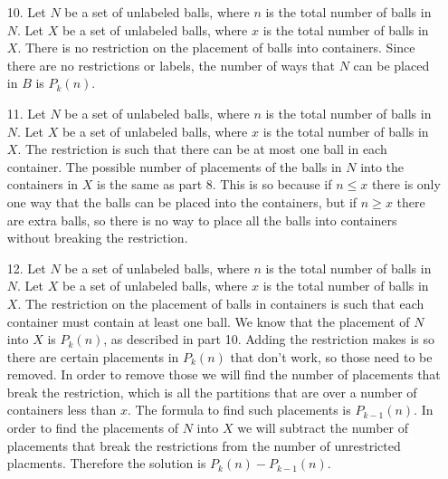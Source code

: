 \documentclass[10pt,a4paper]{report}
\begin{document}
\begin{enumerate}
		\item[10.] Let $N$ be a set of unlabeled balls, where $n$ is the total number of balls in $N$.  Let $X$ be a set of unlabeled balls, where $x$ is the total number of balls in $X$.  There is no restriction on the placement of balls into containers.  Since there are no restrictions or labels, the number of ways that $N$ can be placed in $B$ is $P_{k}(n)$.  
		
		\item[11.] Let $N$ be a set of unlabeled balls, where $n$ is the total number of balls in $N$.  Let $X$ be a set of unlabeled balls, where $x$ is the total number of balls in $X$. The restriction is such that there can be at most one ball in each container.  The possible number of placements of the balls in $N$ into the containers in $X$ is the same as part 8.  This is so because if $n\leq x$ there is only one way that the balls can be placed into the containers, but if $n\geq x$ there are extra balls, so there is no way to place all the balls into containers without breaking the restriction.
		
		\item[12.] Let $N$ be a set of unlabeled balls, where $n$ is the total number of balls in $N$.  Let $X$ be a set of unlabeled balls, where $x$ is the total number of balls in $X$.  The restriction on the placement of balls in containers is such that each container must contain at least one ball.  We know that the placement of $N$ into $X$ is $P_{k}(n)$, as described in part 10.  Adding the restriction makes is so there are certain placements in $P_{k}(n)$ that don't work, so those need to be removed.  In order to remove those we will find the number of placements that break the restriction, which is all the partitions that are over a number of containers less than $x$.  The formula to find such placements is $P_{k-1}(n)$.  In order to find the placements of $N$ into $X$ we will subtract the number of placements that break the restrictions from the number of unrestricted placments.  Therefore the solution is $P_{k}(n)-P_{k-1}(n)$.
		
	\end{enumerate}
\end{document}
